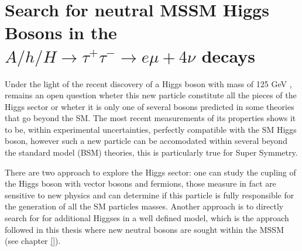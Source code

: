 \chapter[Neutral MSSM Higgs Bosons Search...]{Search for neutral MSSM Higgs Bosons in the 
$A/h/H \rightarrow \tau^{+}\tau^{-} \rightarrow e \mu + 4\nu$ decays} \label{chap:anal}



 \vspace{1cm}

%
%
Under the light of the recent discovery of a Higgs 
boson with mass of 125 GeV \cite{}, remains an open question
wheter this new particle constitute all the pieces of the Higgs
sector or wheter it is only one of several bosons predicted in some theories 
that go beyond the SM. The most recent measurements \cite{} of its
properties shows it to be, within experimental uncertainties, perfectly 
compatible with the SM Higgs boson, however such a new particle can 
be accomodated within several beyond the 
standard model (BSM) theories, this is particularly true for Super Symmetry. 

There are two approach to explore the Higgs sector:
one can study the cupling of the Higgs boson with vector
bosons and fermions, those measure in fact are sensitive to new physics and can determine
if this particle is  fully responsible for
the generation of all the SM particles masses. 
Another approach is to directly search for %
for additional Higgses in a well defined model, which is the approach followed in this
thesis where new neutral bosons are sought within the MSSM (see chapter \ref{}). 



